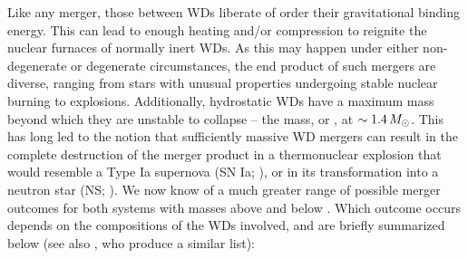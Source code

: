 Like any merger, those between WDs liberate of order their gravitational binding energy.  This can lead to enough heating and/or compression to reignite the nuclear furnaces of normally inert WDs.  As this may happen under either non-degenerate or degenerate circumstances, the end product of such mergers are diverse, ranging from stars with unusual properties undergoing stable nuclear burning to explosions. Additionally, hydrostatic WDs have a maximum mass beyond which they are unstable to collapse -- the \cite{chan31} mass, or \Mch, at $\sim1.4\,\Msun$.  This has long led to the notion that sufficiently massive WD mergers can result in the complete destruction of the merger product in a thermonuclear explosion that would resemble a Type Ia supernova (SN Ia; \citealt{webb84}), or in its transformation into a neutron star (NS; \citealt{nomoi85, saion85}).  We now know of a much greater range of possible merger outcomes for both systems with masses above and below \Mch.  Which outcome occurs depends on the compositions of the WDs involved, and are briefly summarized below (see also \citealt{dan+14}, who produce a similar list):


